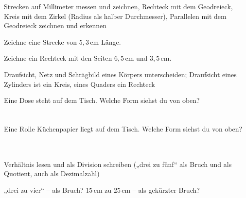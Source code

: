 \begin{aufgabe}{Strecken auf Millimeter messen und zeichnen, Rechteck mit dem Geodreieck, Kreis mit dem Zirkel (Radius als halber Durchmesser), Parallelen mit dem Geodreieck zeichnen und erkennen}
\begin{teile}
\teil Zeichne eine Strecke von $5{,}3\,\text{cm}$ Länge.

\begin{ksys}[xmin=0,xmax=9,ymin=0,ymax=6]\end{ksys}
\teil Zeichne ein Rechteck mit den Seiten $6{,}5\,\text{cm}$ und $3{,}5\,\text{cm}$.

\begin{ksys}[xmin=0,xmax=9,ymin=0,ymax=6]\end{ksys}
\end{teile}
\end{aufgabe}

\begin{aufgabe}{Draufsicht, Netz und Schrägbild eines Körpers unterscheiden; Draufsicht eines Zylinders ist ein Kreis, eines Quaders ein Rechteck}
\begin{teile}
\teil Eine Dose steht auf dem Tisch. Welche Form siehst du von oben? \\  \\  \\ 
\teil Eine Rolle Küchenpapier liegt auf dem Tisch. Welche Form siehst du von oben? \\  \\  \\ 
\end{teile}
\end{aufgabe}

\begin{aufgabe}{Verhältnis lesen und als Division schreiben („drei zu fünf“ als Bruch und als Quotient, auch als Dezimalzahl)}
\begin{teile}
\teil „drei zu vier“ – als Bruch? \leerfeld
\teil $15\,\text{cm}$ zu $25\,\text{cm}$ – als gekürzter Bruch? \leerfeld
\end{teile}
\end{aufgabe}


